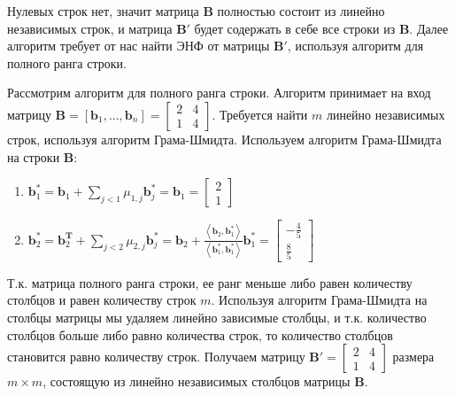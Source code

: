 Нулевых строк нет, значит матрица $ \mathbf{B} $ полностью состоит из линейно независимых строк, и матрица $ \mathbf{B}' $ будет содержать в себе все строки из $ \mathbf{B} $. Далее алгоритм требует от нас найти ЭНФ от матрицы $ \mathbf{B}' $, используя алгоритм для полного ранга строки.

Рассмотрим алгоритм для полного ранга строки. Алгоритм принимает на вход матрицу $ \mathbf{B} = \left[ \mathbf{b}_1, \ldots, \mathbf{b}_n \right] =
\left[ \begin{array}{cccc}
2 & 4 \\
1 & 4
\end{array} \right] $. Требуется найти $ m $ линейно независимых строк, используя алгоритм Грама-Шмидта. Используем алгоритм Грама-Шмидта на строки $ \mathbf{B} $:

\begin{enumerate}

\item $ \mathbf{b}^*_1 = \mathbf{b}_1 + \sum\limits_{j < 1} \mu_{1, j}\mathbf{b}^*_j = \mathbf{b}_1 = \left[ \begin{array}{cccc}
2 \\ 
1 
\end{array}
\right]$

\item $ \mathbf{b}^*_2 = \mathbf{b}^{\mathbf{T}}_2 + \sum\limits_{j < 2} \mu_{2, j}\mathbf{b}^*_j = \mathbf{b}_2 + \frac{\left\langle \mathbf{b}_2, \mathbf{b}^*_1 \right\rangle}{\left\langle \mathbf{b}^*_1, \mathbf{b}^*_1 \right\rangle} \mathbf{b}^*_1 = \left[ \begin{array}{cccc}
-\frac{4}{5} \\
\frac{8}{5}
\end{array}
\right]$

\end{enumerate}

Т.к. матрица полного ранга строки, ее ранг меньше либо равен количеству столбцов и равен количеству строк $ m $. Используя алгоритм Грама-Шмидта на столбцы матрицы мы удаляем линейно зависимые столбцы, и т.к. количество столбцов больше либо равно количества строк, то количество столбцов становится равно количеству строк. Получаем матрицу $ \mathbf{B}' = \left[\begin{array}{cccc}
2 & 4 \\
1 & 4
\end{array}\right] $ размера $ m \times m $, состоящую из линейно независимых столбцов матрицы $ \mathbf{B} $.


